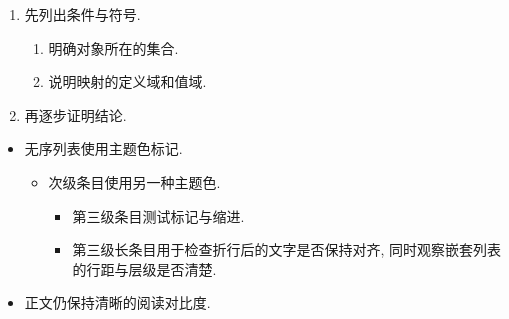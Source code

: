 \documentclass[UTF8,12pt,oneside,fontset=fandol,notitlepage]{ctexart}
\theoremstyle{definition}
\begin{document}
\begin{enumerate}
    \item
        先列出条件与符号.
        \begin{enumerate}
            \item
                明确对象所在的集合.
            \item
                说明映射的定义域和值域.
        \end{enumerate}
    \item
        再逐步证明结论.
\end{enumerate}
\begin{itemize}
    \item
        无序列表使用主题色标记.
        \begin{itemize}
            \item
                次级条目使用另一种主题色.
                \begin{itemize}
                    \item
                        第三级条目测试标记与缩进.
                    \item
                        第三级长条目用于检查折行后的文字是否保持对齐,
                        同时观察嵌套列表的行距与层级是否清楚.
                \end{itemize}
        \end{itemize}
    \item
        正文仍保持清晰的阅读对比度.
\end{itemize}
\end{document}
